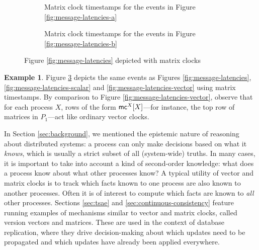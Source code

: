 \documentclass[]             %
{NASA}                       %
\theoremstyle{definition}
\newtheorem{example}[theorem]{Example}
\begin{document}
\begin{figure}[p]
  \begingroup
  \setlength\belowcaptionskip{4ex}
  \begin{subfigure}{1\textwidth}
    \caption{Matrix clock timestamps for the events in Figure \ref{fig:message-latencies-a}}
    \label{fig:message-latencies-matrix-a}
  \end{subfigure}
  \begin{subfigure}{1\textwidth}
    \caption{Matrix clock timestamps for the events in Figure \ref{fig:message-latencies-b}}
    \label{fig:message-latencies-matrix-b}
  \end{subfigure}
  \caption{Figure \ref{fig:message-latencies} depicted with matrix clocks}
  \label{fig:message-latencies-matrix}
  \endgroup
\end{figure}

\begin{example}
  Figure \ref{fig:message-latencies-matrix} depicts the same events as
  Figures \ref{fig:message-latencies},
  \ref{fig:message-latencies-scalar} and
  \ref{fig:message-latencies-vector} using matrix timestamps. By
  comparison to Figure \ref{fig:message-latencies-vector}, observe
  that for each process $X$, rows of the form $\mathsf{mc}^{X}{[X]}{}$---for
  instance, the top row of matrices in $P_1$---act like ordinary vector
  clocks.
\end{example}

In Section \ref{sec:background}, we mentioned the epistemic nature of
reasoning about distributed systems: a process can only make decisions
based on what it \emph{knows}, which is usually a strict subset of all
(system-wide) truths. In many cases, it is important to take into
account a kind of second-order knowledge: what does a process know
about what other processes know? A typical utility of vector and
matrix clocks is to track which facts known to one process are also
known to another processes. Often it is of interest to compute which
facts are known to \emph{all} other processes. Sections \ref{sec:tsae}
and \ref{sec:continuous-consistency} feature running examples of
mechanisms similar to vector and matrix clocks, called version vectors
and matrices. These are used in the context of database replication,
where they drive decision-making about which updates need to be
propagated and which updates have already been applied everywhere.
\end{document}
